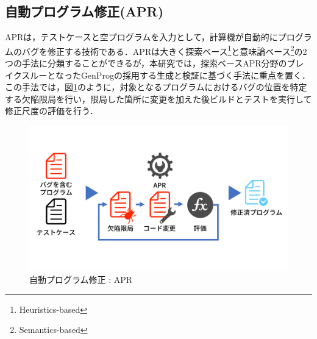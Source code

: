 \documentclass[uplatex,dvipdfmx,a4paper]{jsarticle}
\let\oldcite\cite
\renewcommand{\cite}[1]{\xspace\oldcite{#1}}
\begin{document}
\subsection{自動プログラム修正(APR)}\label{sec:apr}
APRは，テストケースと空プログラムを入力として，計算機が自動的にプログラムのバグを修正する技術である．APRは大きく探索ベース\footnote{Heuristics-based}と意味論ベース\footnote{Semantics-based}の2つの手法に分類することができるが，本研究では，探索ベースAPR分野のブレイクスルーとなったGenProg\cite{le2011genprog}の採用する生成と検証\cite{martinez2019astor}に基づく手法に重点を置く．\\
この手法では，図\ref{fig:apr}のように，対象となるプログラムにおけるバグの位置を特定する欠陥限局を行い，限局した箇所に変更を加えた後ビルドとテストを実行して修正尺度の評価を行う．
\begin{figure}[t]
  \centering
  \includegraphics[width=\linewidth]{fig/apr.pdf}
  \caption{自動プログラム修正 : APR}
  \label{fig:apr}
\end{figure}
\end{document}
